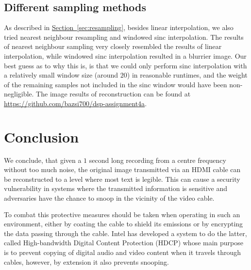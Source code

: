 \documentclass{article}
\newcommand{\sectionref}[1]{\hyperref[sec:#1]{Section~\ref*{sec:#1}}}
\begin{document}
\subsection{Different sampling methods}

As described in \sectionref{resampling}, besides linear interpolation, we also tried nearest neighbour resampling and windowed sinc interpolation. The results of nearest neighbour sampling very closely resembled the results of linear interpolation, while windowed sinc interpolation resulted in a blurrier image. Our best guess as to why this is, is that we could only perform sinc interpolation with a relatively small window size (around $20$) in reasonable runtimes, and the weight of the remaining samples not included in the sinc window would have been non-negligible. The image results of reconstruction can be found at \url{https://github.com/bazsi700/dsp-assignment4a}.


\section{Conclusion}
\label{sec:conclusion}

We conclude, that given a $1$ second long recording from a centre frequency without too much noise, the original image transmitted via an HDMI cable can be reconstructed to a level where most text is legible. This can cause a security vulnerability in systems where the transmitted information is sensitive and adversaries have the chance to snoop in the vicinity of the video cable. 

To combat this protective measures should be taken when operating in such an environment, either by coating the cable to shield its emissions or by encrypting the data passing through the cable. Intel has developed a system to do the latter, called High-bandwidth Digital Content Protection (HDCP) whose main purpose is to prevent copying of digital audio and video content when it travels through cables, however, by extension it also prevents snooping.
\end{document}
